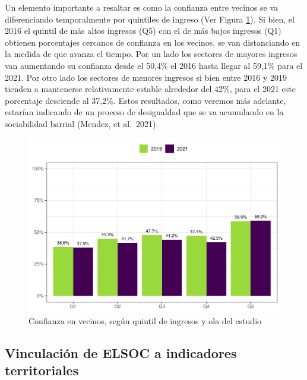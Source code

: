 \documentclass[
  12pt,
]{book}
\begin{document}
Un elemento importante a resaltar es como la confianza entre vecinos se va diferenciando temporalmente por quintiles de ingreso (Ver Figura \ref{fig:vecinos-quintil}). Si bien, el 2016 el quintil de más altos ingresos (Q5) con el de más bajos ingresos (Q1) obtienen porcentajes cercanos de confianza en los vecinos, se van distanciando en la medida de que avanza el tiempo. Por un lado los sectores de mayores ingresos van aumentando su confianza desde el 50,4\% el 2016 hasta llegar al 59,1\% para el 2021. Por otro lado los sectores de menores ingresos si bien entre 2016 y 2019 tienden a mantenerse relativamente estable alrededor del 42\%, para el 2021 este porcentaje desciende al 37,2\%. Estos resultados, como veremos más adelante, estarían indicando de un proceso de desigualdad que se va acumulando en la sociabilidad barrial (Mendez, et al.~2021).

\begin{figure}

{\centering \includegraphics{reporte-elsoc_files/figure-latex/vecinos-quintil-1} 

}

\caption{Confianza en vecinos, según quintil de ingresos y ola del estudio}\label{fig:vecinos-quintil}
\end{figure}

\hypertarget{vinculaciuxf3n-de-elsoc-a-indicadores-territoriales}{%
\subsection*{Vinculación de ELSOC a indicadores territoriales}\label{vinculaciuxf3n-de-elsoc-a-indicadores-territoriales}}
\end{document}
